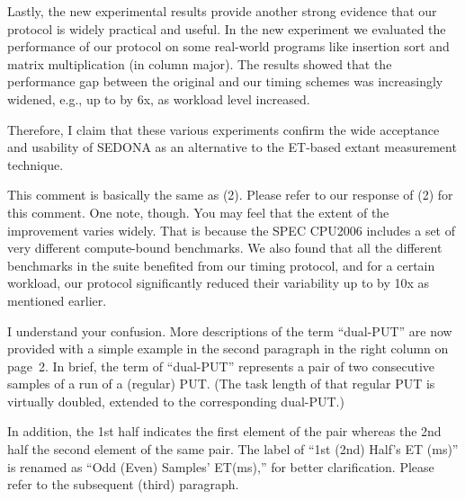 \documentclass[10pt,letterpaper]{article}
\newenvironment{myindentpar}[1]%
{\begin{list}{}
         {\vspace{10pt}
					\setlength{\leftmargin}{#1}}
          \item[]
}
{\end{list}}
\newcommand{\rev}[1]{\begin{myindentpar}{.25in} {\em {\color{blue}{#1}}}\end{myindentpar}}
\begin{document}
Lastly, the new experimental results provide 
another strong evidence that our protocol is widely practical and useful. 
In the new experiment we evaluated the performance of our protocol 
on some real-world programs like insertion sort and matrix multiplication (in column major). 
The results showed that the performance gap between the original and our timing schemes  
was increasingly widened, e.g., up to by 6x, as workload level increased. 

Therefore, I claim that these various experiments confirm 
the wide acceptance and usability of SEDONA as an alternative to the 
ET-based extant measurement technique. 

\rev{ 
(3) The improvement of the SEDONA is little. And the extent of the each
benchmark’s improvement described in Table 3 varies widely. Thus, the
experimental results does not confirm whether the SEDONA is widely
practical or is useful.
}

This comment is basically the same as (2). Please refer to our response of (2) for this comment. One note, though. You may feel that the extent of the improvement varies widely. That is because the SPEC CPU2006 includes a set of very different compute-bound benchmarks. We also found that all the different benchmarks in the suite benefited from our timing protocol, and for a certain workload, our protocol significantly reduced their variability up to by 10x as mentioned earlier.


\rev{ 
(4) Since the explanation of ``dual-PUT'' is not enough, I can not well
understand the algorithm shown in Fig. 3. Similarly, what is “1st
Half’s ET (ms)” attached at Fig. 4(b), 4(c), 4(d) ? I understood only that
the label is related with “dual-PUT”. These words are important in the
manuscript. So, please keep in mind to write understandably.
}

I understand your confusion. More descriptions of the term ``\hbox{dual-PUT}'' are now 
provided with a simple example in the second paragraph in the right column on page~2.  
In brief, the term of ``dual-PUT'' represents 
a pair of two consecutive samples of a run of a (regular) PUT. 
(The task length of that regular PUT is virtually doubled, extended to the corresponding dual-PUT.) 

In addition, the 1st half indicates the first element of the pair 
whereas the 2nd half the second element of the same pair. 
The label of ``1st (2nd) Half's ET (ms)'' is renamed as ``Odd (Even) Samples' ET(ms),'' 
for better clarification. Please refer to the subsequent (third) paragraph. 
\end{document}
